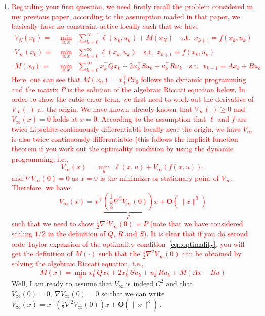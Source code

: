 \documentclass[12pt]{article}
\numberwithin{theorem}{section} %
\theoremstyle{definition}
\theoremstyle{remark}
\begin{document}
\begin{enumerate}
	\item[] \textcolor{red}{Regarding your first question, we need firstly recall the problem considered in my previous paper, according to the assumption maded in that paper, we basically have no constraint active locally such that we have
	\[
	\begin{aligned}
	V_N(x_0) =& \min_{u,x}\;\;\sum_{k=0}^{N-1}\ell(x_k,u_k) + M(x_N) \quad \text{s.t.}\;\;x_{k+1} = f(x_k,u_k)\\
	V_\infty(x_0) =& \min_{u,x}\;\;\sum_{k=0}^{\infty}\ell(x_k,u_k) \quad \text{s.t.}\;\;x_{k+1} = f(x_k,u_k)\\
	M(x_0) =& \min_{u,x}\;\;\sum_{k=0}^{\infty}x_k^\top Q x_k + 2 x_k^\top S u_k + u_k^\top R u_k \quad \text{s.t.}\;\;x_{k+1} = A x_k + B u_k
	\end{aligned}
	\]
	Here, one can see that $M(x_0) = x_0^\top P x_0$ follows the dynamic programming and the matrix $P$ is the solution of the algebraic Riccati equation below. In order to show the cubic error term, we first need to work out the derivative of $V_\infty(\cdot)$ at the origin. We have known already known that $V_\infty(\cdot)\geq  0$ and $V_\infty(x)=0$ holds at $x=0$. According to the assumption that $\ell $ and $f$ are twice Lipschitz-continuously differentiable locally near the origin, we have $V_\infty$ is also twice continuously differentiable (this follows the implicit function theorem if you work out the optimality condition by using the dynamic programming, i.e.,
	\begin{equation}\label{eq::optimality}
	V_\infty(x) = \min_u\;\ell(x,u)+V_\infty(f(x,u)),
	\end{equation}
	and
	$
	\nabla V_\infty(0) =0
	$
	as $x=0$ is the minimizer or stationary point of $V_\infty$. Therefore, we have
	\[
     V_\infty(x) = x^\top \underbrace{\left(\frac{1}{2} \nabla^2 V_\infty(0)\right)}_{P} x + \mathbf{O}(\|x\|^3)
	\]
    such that we need to show $\frac{1}{2}\nabla^2 V_\infty(0)=P$ (note that we have considered scaling $1/2$ in the definition of $Q$, $R$ and $S$). It is clear that if you do second orde Taylor expansion of the optimality condition~\eqref{eq::optimality}, you will get the definition of $M(\cdot)$ such that the $\frac{1}{2}\nabla^2 V_\infty(0)$ can be obtained by solving the algebraic Riccati equation, i.e.,
    \[
    M(x) = \min_u x_k^\top Q x_k + 2 x_k^\top S u_k + u_k^\top R u_k + M(Ax+Bu)
    \]
	}
	Well, I am ready to assume that $V_\infty$ is indeed $C^2$ and that $V_\infty(0)=0,~\nabla V_\infty(0)=0$ so that we can write $V_\infty(x) = x^\top \left(\frac{1}{2} \nabla^2 V_\infty(0)\right) x + \mathbf{O}(\|x\|^3) $\,.

\end{enumerate}
\end{document}
